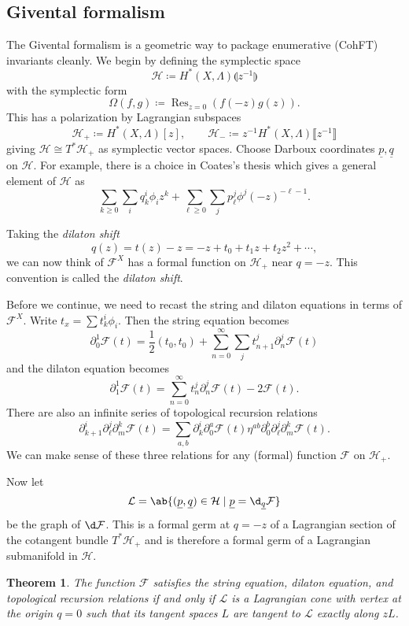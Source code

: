 \documentclass[leqno, openany]{memoir}
\newtheorem{thm}{Theorem}[section]
\theoremstyle{definition}
\theoremstyle{remark}
\theoremstyle{plain}
\theoremstyle{definition}
\theoremstyle{remark}
\newcommand{\mc}[1]{\mathcal{#1}}
\newcommand{\on}[1]{\operatorname{#1}}
\newcommand{\ul}[1]{\underline{#1}}
\begin{document}
\subsection{Givental formalism}

The Givental formalism is a geometric way to package enumerative (CohFT) invariants cleanly. We begin by defining the symplectic space
\[ \mc{H} \coloneqq H^*(X, \Lambda)\llparenthesis z^{-1}\rrparenthesis \]
with the symplectic form
\[ \Omega(f,g) \coloneqq \on{Res}_{z=0} ( f(-z)g(z) ). \]
This has a polarization by Lagrangian subspaces
\[ \mc{H}_+ \coloneqq H^*(X,\Lambda)[z], \qquad \mc{H}_- \coloneqq z^{-1} H^*(X,\Lambda)\llbracket z^{-1} \rrbracket \]
giving $\mc{H} \cong T^* \mc{H}_+$ as symplectic vector spaces. Choose Darboux coordinates $\ul{p}, \ul{q}$ on $\mc{H}$. For example, there is a choice in Coates's thesis which gives a general element of $\mc{H}$ as
\[ \sum_{k \geq 0} \sum_i q_k^i \phi_i z^k + \sum_{\ell \geq 0} \sum_j p_{\ell}^j \phi^j (-z)^{-\ell-1}. \]

Taking the \textit{dilaton shift}
\[ q(z) = t(z) - z = -z + t_0 + t_1 z + t_2 z^2 + \cdots, \]
we can now think of $\mc{F}^X$ has a formal function on $\mc{H}_+$ near $q = -z$. This convention is called the \textit{dilaton shift}.

Before we continue, we need to recast the string and dilaton equations in terms of $\mc{F}^X$. Write $t_x = \sum t_k^i \phi_i$. Then the string equation becomes
\[ \partial_0^1 \mc{F}(t) = \frac{1}{2} (t_0, t_0) + \sum_{n=0}^{\infty} \sum_{j} t_{n+1}^{j} \partial_n^{j} \mc{F}(t) \]
and the dilaton equation becomes
\[ \partial_1^1 \mc{F}(t) = \sum_{n=0}^{\infty} t_n^j \partial_n^j \mc{F}(t) - 2 \mc{F}(t). \]
There are also an infinite series of topological recursion relations
\[ \partial_{k+1}^i \partial_{\ell}^j \partial_{m}^k \mc{F}(t) = \sum_{a,b} \partial_k^i \partial_0^a \mc{F}(t) \eta^{ab} \partial_0^b \partial_{\ell}^j \partial_m^k \mc{F}(t). \]
We can make sense of these three relations for any (formal) function $\mc{F}$ on $\mc{H}_+$.

Now let
\[ \mc{L} = \ab\{(\ul{p}, \ul{q}) \in \mc{H} \mid \ul{p} = \d_{\ul{q}} \mc{F}\} \]
be the graph of $\d \mc{F}$. This is a formal germ at $q=-z$ of a Lagrangian section of the cotangent bundle $T^* \mc{H}_+$ and is therefore a formal germ of a Lagrangian submanifold in $\mc{H}$.

\begin{thm}
    The function $\mc{F}$ satisfies the string equation, dilaton equation, and topological recursion relations if and only if $\mc{L}$ is a Lagrangian cone with vertex at the origin $q=0$ such that its tangent spaces $L$ are tangent to $\mc{L}$ exactly along $z L$.
\end{thm}
\end{document}
